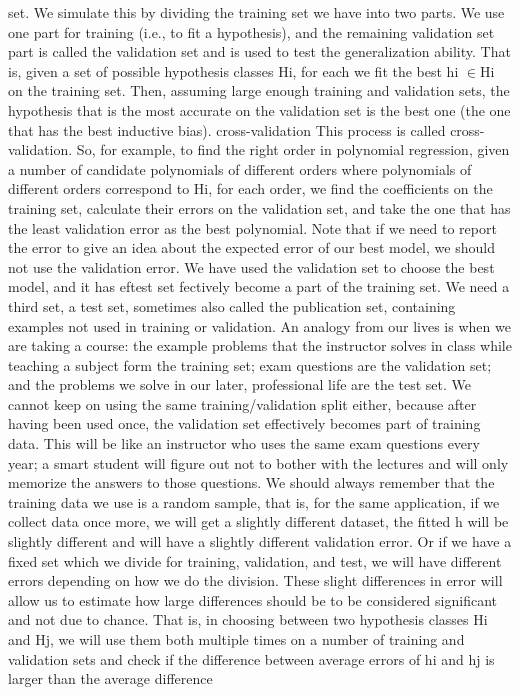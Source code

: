 set. We simulate this by dividing the training set we have into two parts. We use one part for training (i.e., to fit a hypothesis), and the remaining validation set part is called the validation set and is used to test the generalization ability. That is, given a set of possible hypothesis classes Hi, for each we fit the best hi $\in$Hi on the training set. Then, assuming large enough training and validation sets, the hypothesis that is the most accurate on the validation set is the best one (the one that has the best inductive bias). cross-validation This process is called cross-validation. So, for example, to find the right order in polynomial regression, given a number of candidate polynomials of different orders where polynomials of different orders correspond to Hi, for each order, we find the coefficients on the training set, calculate their errors on the validation set, and take the one that has the least validation error as the best polynomial. Note that if we need to report the error to give an idea about the expected error of our best model, we should not use the validation error. We have used the validation set to choose the best model, and it has eftest set fectively become a part of the training set. We need a third set, a test set, sometimes also called the publication set, containing examples not used in training or validation. An analogy from our lives is when we are taking a course: the example problems that the instructor solves in class while teaching a subject form the training set; exam questions are the validation set; and the problems we solve in our later, professional life are the test set. We cannot keep on using the same training/validation split either, because after having been used once, the validation set effectively becomes part of training data. This will be like an instructor who uses the same exam questions every year; a smart student will figure out not to bother with the lectures and will only memorize the answers to those questions. We should always remember that the training data we use is a random sample, that is, for the same application, if we collect data once more, we will get a slightly different dataset, the fitted h will be slightly different and will have a slightly different validation error. Or if we have a fixed set which we divide for training, validation, and test, we will have different errors depending on how we do the division. These slight differences in error will allow us to estimate how large differences should be to be considered significant and not due to chance. That is, in choosing between two hypothesis classes Hi and Hj, we will use them both multiple times on a number of training and validation sets and check if the difference between average errors of hi and hj is larger than the average difference

